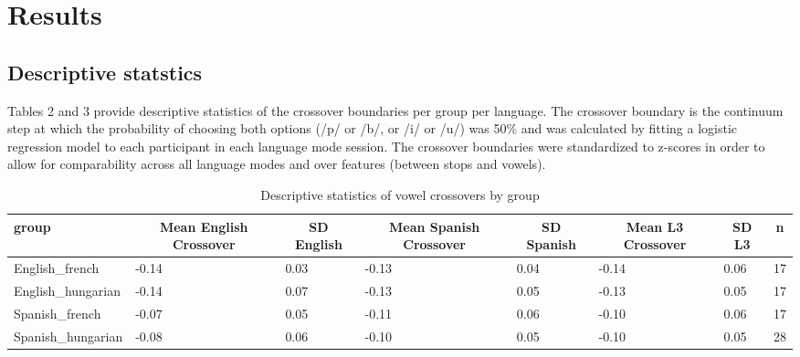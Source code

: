 \documentclass[
  man]{apa6}
\begin{document}
\hypertarget{results}{%
\section{Results}\label{results}}

\hypertarget{descriptive-statstics}{%
\subsection{Descriptive statstics}\label{descriptive-statstics}}

Tables 2 and 3 provide descriptive statistics of the crossover boundaries per group per language. The crossover boundary is the continuum step at which the probability of choosing both options (/p/ or /b/, or /i/ or /u/) was 50\% and was calculated by fitting a logistic regression model to each participant in each language mode session.
The crossover boundaries were standardized to z-scores in order to allow for comparability across all language modes and over features (between stops and vowels).

\begin{table}[tbp]

\begin{center}
\begin{threeparttable}

\caption{\label{tab:unnamed-chunk-3}Descriptive statistics of vowel crossovers by group}

\begin{tabular}{llllllll}
\toprule
group & \multicolumn{1}{c}{Mean English Crossover} & \multicolumn{1}{c}{SD English} & \multicolumn{1}{c}{Mean Spanish Crossover} & \multicolumn{1}{c}{SD Spanish} & \multicolumn{1}{c}{Mean L3 Crossover} & \multicolumn{1}{c}{SD L3} & \multicolumn{1}{c}{n}\\
\midrule
English\_french & -0.14 & 0.03 & -0.13 & 0.04 & -0.14 & 0.06 & 17\\
English\_hungarian & -0.14 & 0.07 & -0.13 & 0.05 & -0.13 & 0.05 & 17\\
Spanish\_french & -0.07 & 0.05 & -0.11 & 0.06 & -0.10 & 0.06 & 17\\
Spanish\_hungarian & -0.08 & 0.06 & -0.10 & 0.05 & -0.10 & 0.05 & 28\\
\bottomrule
\end{tabular}

\end{threeparttable}
\end{center}

\end{table}
\end{document}
